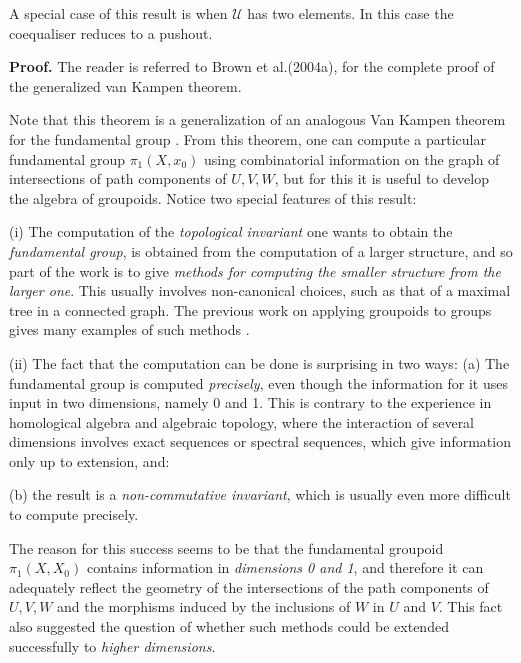 \documentclass[12pt]{article}
\theoremstyle{plain}
\theoremstyle{definition}
\numberwithin{equation}{section}
\newcommand{\cU}{\mathcal U}
\begin{document}
A special case of this result is when $\cU$ has two elements. In this case the coequaliser reduces to a pushout.

{\bf Proof.} The reader is referred to Brown et al.(2004a), \cite{BHKP} for the complete proof of the generalized van Kampen theorem.


Note that this theorem is a generalization of an analogous Van Kampen theorem for the fundamental group \cite {Brown1}. From this theorem, one can compute a particular fundamental group $\pi_1(X,x_0)$ using combinatorial information on the graph of intersections of path components of $U,V,W$, but for this it is useful to develop the algebra of groupoids. Notice two special features of this result:

\noindent (i) The computation of the  {\em topological invariant} one wants to obtain the {\em fundamental group}, is obtained from the computation of a larger structure, and so part of the work is to give {\em methods for computing the smaller structure from the larger one}. This usually involves non-canonical choices, such as that of a maximal tree in a connected graph. The previous work on applying groupoids to groups gives many examples of such methods \cite {brownbook:2}.


\noindent (ii) The fact that the computation can be done is surprising in two ways:
 (a) The fundamental group is computed {\em precisely}, even though the information for 
it uses input in two dimensions, namely $0$ and 1. This is contrary to the experience in
homological algebra and algebraic topology, where the interaction of several dimensions involves 
exact sequences or spectral sequences, which give information only up to extension,  and: 

 (b) the result is a {\em non-commutative invariant}, which is usually even more difficult to 
compute precisely.


The reason for this success seems to be that the fundamental groupoid $\pi_1(X,X_0)$ contains 
information in \emph{dimensions 0 and 1}, and therefore it can adequately reflect the geometry 
of the intersections of the path components of $U,V,W$ and the morphisms induced by the 
inclusions of $W$ in $U$ and $V$. This fact also suggested the question of whether such 
methods could be extended successfully to {\em higher dimensions}.
\end{document}
